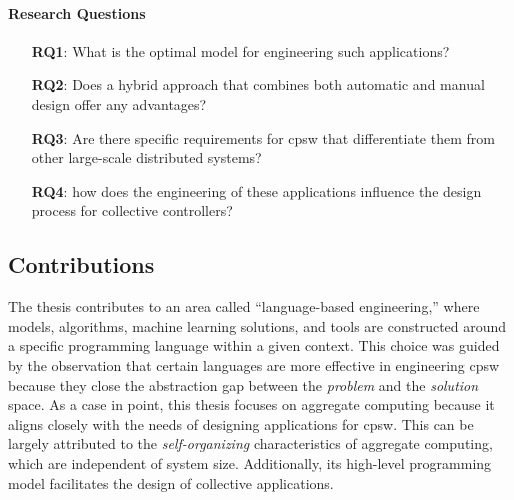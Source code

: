 \paragraph*{Research Questions}
\begin{itemize}
    \item[\textbf{RQ1}:] What is the optimal model for engineering such applications?
    \item[\textbf{RQ2}:] Does a hybrid approach that combines both automatic and manual design offer any advantages? 
    \item[\textbf{RQ3}:] Are there specific requirements for \ac{cpsw} that differentiate them from other large-scale distributed systems?
    \item[\textbf{RQ4}:] how does the engineering of these applications influence the design process for collective controllers?
\end{itemize}

\subsection*{Contributions}

The thesis contributes to an area called ``language-based engineering,'' where models, algorithms, machine learning solutions, and tools are constructed around a specific programming language within a given context. 
This choice was guided by the observation that certain languages are more effective in engineering \ac{cpsw} because they close the abstraction gap between the \emph{problem} and the \emph{solution} space.
As a case in point, this thesis focuses on aggregate computing because it aligns closely with the needs of designing applications for \acf{cpsw}. 
This can be largely attributed to the \emph{self-organizing} characteristics of aggregate computing, which are independent of system size. Additionally, its high-level programming model facilitates the design of collective applications.

